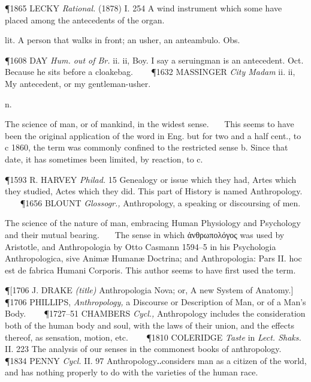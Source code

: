 \begin{description}[wide, labelwidth=!, labelindent=0pt]
\begin{myenumerate}
\P 1865 LECKY \textit{Rational.} (1878) I. 254 A wind instrument which some have placed
among the antecedents of the organ.

 lit. A person that walks in front; an usher, an anteambulo. Obs. 

\P 1608 DAY \textit{Hum. out of Br.} ii. ii, Boy. I say a seruingman is an antecedent.
Oct. Because he sits before a cloakebag.    
\P 1632 MASSINGER \textit{City Madam} ii. ii, My
antecedent, or my gentleman-usher.
\end{myenumerate}

  n.

\noindent  {}

\vspace{-0.3cm}

\begin{myenumerate}
 The science of man, or of mankind, in the widest sense.
   This seems to have been the original application of the word in Eng. but for
two and a half cent., to c 1860, the term was commonly confined to the
restricted sense b. Since that date, it has sometimes been limited, by reaction,
to c. 

\P 1593 R. HARVEY \textit{Philad.} 15 Genealogy or issue which they had, Artes which they
studied, Actes which they did. This part of History is named Anthropology.
   
\P 1656 BLOUNT \textit{Glossogr.,} Anthropology, a speaking or discoursing of men.

 The science of the nature of man, embracing Human Physiology and
Psychology and their mutual bearing.
   The sense in which ἀνθρωπολόγος was used by Aristotle, and Anthropologia by
Otto Casmann 1594–5 in his Psychologia Anthropologica, sive Animæ Humanæ
Doctrina; and Anthropologia: Pars II. hoc est de fabrica Humani Corporis. This
author seems to have first used the term. 

\P [1706 J. DRAKE \textit{(title)} Anthropologia Nova; or, A new System of Anatomy.]
\P 1706 PHILLIPS, \textit{Anthropology,} a Discourse or Description of Man, or of a Man's
Body.    
\P 1727–51 CHAMBERS \textit{Cycl.,} Anthropology includes the consideration both of
the human body and soul, with the laws of their union, and the effects thereof,
as sensation, motion, etc.    
\P 1810 COLERIDGE \textit{Taste} in \textit{Lect. Shaks.} II. 223 The
analysis of our senses in the commonest books of anthropology.    
\P 1834 PENNY \textit{Cycl.} II. 97 Anthropology‥considers man as a citizen of the world, and has
nothing properly to do with the varieties of the human race.


\end{myenumerate}
\end{description}
